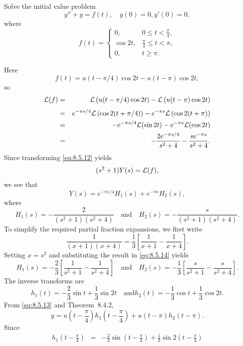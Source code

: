 \documentclass{ximera}
\begin{document}
\begin{example}\label{example:8.5.4}
 Solve the initial value problem
\begin{equation}\label{eq:8.5.12}
y''+y=f(t), \quad   y(0)=0,  y'(0)=0,
\end{equation}
where
$$
f(t)=\left\{\begin{array}{cl}
 0,&0\leq t<\frac{\pi}{4},\\
\cos2t,&\frac{\pi}{4}\leq t<\pi,\\
 0,&t\geq\pi.
\end{array}\right.
$$
\begin{explanation}
Here
$$
f(t)=u(t-\pi/4)\cos2t-u(t-\pi)\cos2t,
$$
so
\begin{eqnarray*}
{\cal L}(f)&=&{\cal L}\left(u(t-\pi/4)\cos2t\right)-{\cal L}\left(
u(t-\pi)\cos2t\right)\\[1\jot]
&=&e^{-{\pi s/4}}{\cal L}\left(\cos2(t+\pi/4)\right)-e^{-\pi s}
{\cal L}\left(\cos2(t+\pi)\right)\\
&=&-e^{-{\pi s/4}}{\cal L}(\sin2t)-e^{-\pi s}
{\cal L}(\cos2t)\\
&=&-\frac{2e^{-{\pi s/ 4}}}{s^2+4}-\frac{se^{-\pi s}}{s^2+4}.
\end{eqnarray*}
Since transforming \eqref{eq:8.5.12} yields
$$
(s^2+1)Y(s)={\cal L}(f),
$$
we see that
\begin{equation}\label{eq:8.5.13}
Y(s)=e^{-{\pi s/ 4}} H_1(s)+e^{-\pi s} H_2(s),
\end{equation}
where
\begin{equation}\label{eq:8.5.14}
H_1(s)=-\frac{2}{(s^2+1)(s^2+4)}\quad\mbox{and}\quad H_2(s)=-\frac{s}{(s^2+1)(s^2+4)}.
\end{equation}
To simplify the required partial fraction expansions, we first write
$$
\frac{1}{(x+1)(x+4)}=\frac{1}{3}\left[\frac{1}{x+1}-\frac{1}{x+4}\right].
$$
Setting $x=s^2$ and substituting the result in  \eqref{eq:8.5.14} yields
$$
H_1(s)=-\frac{2}{3}\left[\frac{1}{s^2+1}-\frac{1}{s^2+4}\right]
\quad\mbox{and}\quad
H_2(s)=-\frac{1}{3}\left[\frac{s}{s^2+1}-\frac{s}{s^2+4}\right].
$$
The inverse transforms are
$$
h_1(t)=-\frac{2}{3}\sin t+\frac{1}{3}\sin2t
\quad\mbox{and}
h_2(t)=-\frac{1}{3}\cos t+\frac{1}{3}\cos2t.
$$
From  \eqref{eq:8.5.13} and Theorem~8.4.2,
\begin{equation}\label{eq:8.5.15}
y=u\left(t-\frac{\pi}{4}\right) h_1\left(t-\frac{\pi}{4}\right)+
u(t-\pi) h_2(t-\pi).
\end{equation}
Since
\begin{eqnarray*}
h_1\left(t-\frac{\pi}{4}\right)&=&-\frac{2}{3}\sin\left(t-\frac{\pi}{4}\right)+\frac{1}{3}\sin2\left(t-\frac{\pi}{4}\right)\\

\end{eqnarray*}
\end{explanation}
\end{example}
\end{document}
